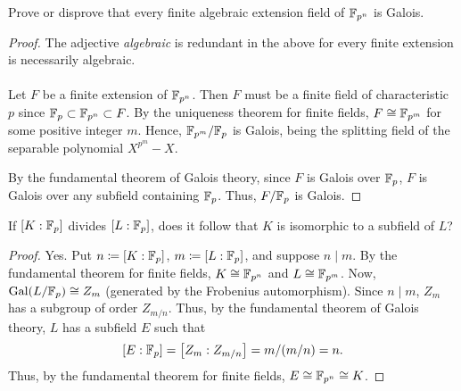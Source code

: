 \begin{problem}
Prove or disprove that every finite algebraic extension field of
$\mathbb{F}_{p^n}$ is Galois.
\end{problem}
\begin{proof}
The adjective \emph{algebraic} is redundant in the above for every finite
extension is necessarily algebraic.
\\\\
Let $F$ be a finite extension of $\mathbb{F}_{p^n}$. Then $F$ must be a finite
field of characteristic $p$ since $\mathbb{F}_p\subset\mathbb{F}_{p^n}\subset F$. By
the uniqueness theorem for finite fields, $F\cong\mathbb{F}_{p^m}$ for some
positive integer $m$. Hence, $\mathbb{F}_{p^m}/\mathbb{F}_p$ is Galois, being the
splitting field of the separable polynomial $X^{p^m}-X$.

By the fundamental theorem of Galois theory, since $F$ is Galois over
$\mathbb{F}_p$, $F$ is Galois over any subfield containing $\mathbb{F}_p$. Thus,
$F/\mathbb{F}_p$ is Galois.
\end{proof}

\begin{problem}
If $[K:\mathbb{F}_p]$ divides $[L:\mathbb{F}_p]$, does it follow that $K$ is isomorphic
to a subfield of $L$?
\end{problem}
\begin{proof}
Yes. Put $n\coloneqq\left[K:\mathbb{F}_p\right]$, $m\coloneqq[L:\mathbb{F}_p]$, and
suppose $n\mid m$. By the fundamental theorem for finite fields,
$K\cong\mathbb{F}_{p^n}$ and $L\cong\mathbb{F}_{p^m}$. Now, $\operatorname{Gal}(L/\mathbb{F}_p)\cong Z_m$
(generated by the Frobenius automorphism). Since $n\mid m$, $Z_m$ has a
subgroup of order $Z_{m/n}$. Thus, by the fundamental theorem of Galois
theory, $L$ has a subfield $E$ such that
\[
\left[E:\mathbb{F}_p\right]=\left[Z_m:Z_{m/n}\right]=m/(m/n)=n.
\]
Thus, by the fundamental theorem for finite fields, $E\cong\mathbb{F}_{p^n}\cong
K$.
\end{proof}

